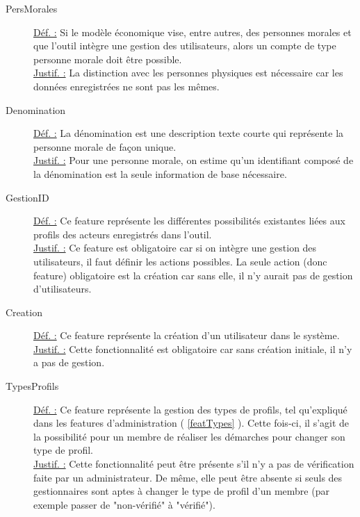 \begin{description}
\item [PersMorales]
\underline{Déf. :}  Si le modèle économique vise,  entre autres,  des personnes morales et que l'outil intègre une gestion des utilisateurs,  alors un compte de type personne morale doit être possible.
\\ \underline{Justif. :}  La distinction avec les personnes physiques est nécessaire car les données enregistrées ne sont pas les mêmes.
\newline

\item [Denomination]
\underline{Déf. :}  La dénomination est une description texte courte qui représente la personne morale de façon unique.  
\\ \underline{Justif. :}  Pour une personne morale,  on estime qu'un identifiant composé de la dénomination est la seule information de base nécessaire.  
\newline

\item [GestionID]
\underline{Déf. :}  Ce feature représente les différentes possibilités existantes liées aux profils des acteurs enregistrés dans l'outil.  
\\ \underline{Justif. :}  Ce feature est obligatoire car si on intègre une gestion des utilisateurs,  il faut définir les actions possibles.  La seule action (donc feature) obligatoire est la création car sans elle,  il n'y aurait pas de gestion d'utilisateurs.  
\newline

\item [Creation]
\underline{Déf. :}  Ce feature représente la création d'un utilisateur dans le système.
\\ \underline{Justif. :}  Cette fonctionnalité est obligatoire car sans création initiale,   il n'y a pas de gestion. 
\newline

\item [TypesProfils]
\underline{Déf. :}   Ce feature représente la gestion des types de profils,  tel qu'expliqué dans les features d'administration ( \ref{featTypes} ).  Cette fois-ci,  il s'agit de la possibilité pour un membre de réaliser les démarches pour changer son type de profil.
\\ \underline{Justif. :}  Cette fonctionnalité peut être présente s'il n'y a pas de vérification faite par un administrateur.  De même,  elle peut être absente si seuls des gestionnaires sont aptes à changer le type de profil d'un membre (par exemple passer de "non-vérifié" à "vérifié").  
\newline


\end{description}
